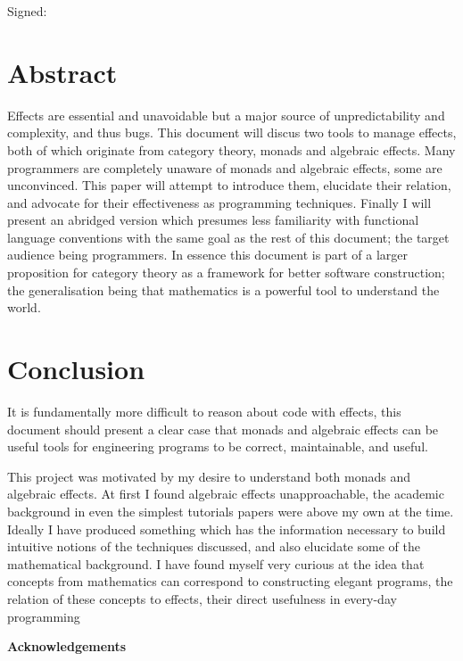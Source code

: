 \documentclass[a4paper,10pt]{article}
\newenvironment{spaced}[1]
  {\begin{minipage}[c]{\textwidth}\vspace{#1}}
  {\end{minipage}}
\theoremstyle{definition}
\begin{document}
  \begin{spaced}{5em}
    Signed:
  \end{spaced}
\pagebreak

\section{Abstract}

Effects are essential and unavoidable
but a major source of unpredictability
and complexity, and thus bugs.
This document will discus two tools to manage effects,
both of which originate from category theory,
monads and algebraic effects.
Many programmers are completely unaware of monads and algebraic effects,
some are unconvinced.
This paper will attempt to introduce them,
elucidate their relation,
and advocate for their effectiveness as programming techniques.
Finally I will present an abridged version
which presumes less familiarity with functional language conventions
with the same goal as the rest of this document;
the target audience being programmers.
In essence this document is part of a larger
proposition for category theory as a framework for better software construction;
the generalisation being that mathematics is a powerful tool to understand the world.

\pagebreak
\tableofcontents

\pagebreak


\pagebreak


\pagebreak


\pagebreak


\pagebreak


\pagebreak
\section{Conclusion}
It is fundamentally more difficult to reason about code with effects,
this document should present a clear case that monads and algebraic effects
can be useful tools for engineering programs to be correct, maintainable, and useful.

This project was motivated by my desire to understand both monads and algebraic effects.
At first I found algebraic effects unapproachable,
the academic background in even the simplest tutorials papers were above my own at the time.
Ideally I have produced something which has the information
necessary to build intuitive notions of the techniques discussed,
and also elucidate some of the mathematical background.
I have found myself very curious at the idea that concepts
from mathematics can correspond to constructing elegant programs,
the relation of these concepts
to effects,
their direct usefulness in
every-day programming

\textbf{Acknowledgements}

\pagebreak
\appendix



\pagebreak


\end{document}
